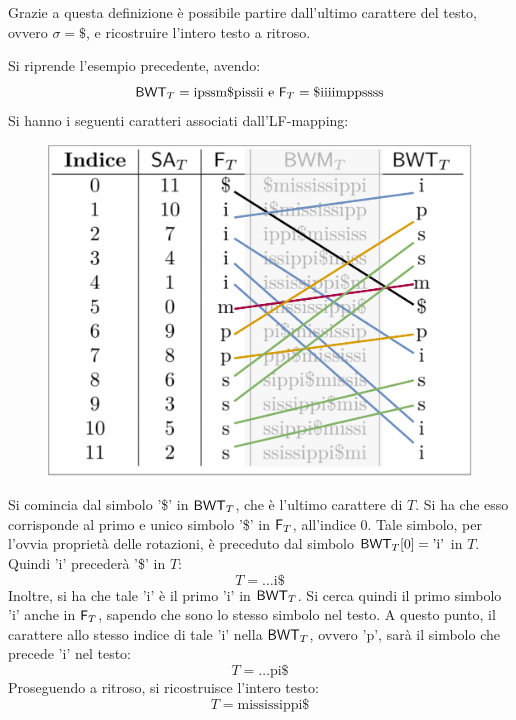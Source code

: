 Grazie a questa definizione è possibile partire dall'ultimo carattere del testo,
ovvero $\sigma=\$$, e ricostruire l'intero testo a ritroso. 
\begin{esempio}
  Si riprende l'esempio precedente, avendo:
  \[\mbox{\rm {\sf BWT}}_T=\mbox{ipssm\$pissii}\mbox{ e }\mbox{\rm {\sf F}}_T=\mbox{\$iiiimppssss}\]
  Si hanno i seguenti caratteri associati dall'LF-mapping:
  \begin{figure}[H]
    \centering
    \includegraphics[scale = 0.33]{img/lf2.pdf}
  \end{figure}
  Si comincia dal simbolo '\$' in $\mbox{\rm {\sf BWT}}_T$, che è l'ultimo carattere di $T$. Si
  ha che esso corrisponde al primo e unico simbolo '\$' in $\mbox{\rm {\sf F}}_T$, all'indice
  $0$. Tale simbolo, per l'ovvia proprietà delle rotazioni, è preceduto dal
  simbolo $\mbox{\rm {\sf BWT}}_T[0]=\mbox{'i'}$ in $T$. Quindi $\mbox{'i'}$ precederà '\$' in
  $T$:
  \[T=\ldots\mbox{i\$}\]
  Inoltre, si ha che
  tale $\mbox{'i'}$ è il primo $\mbox{'i'}$ in $\mbox{\rm {\sf BWT}}_T$. Si cerca quindi il
  primo simbolo $\mbox{'i'}$ anche in $\mbox{\rm {\sf F}}_T$,
  sapendo che sono lo stesso simbolo nel testo. A questo punto, il carattere
  allo
  stesso indice di tale $\mbox{'i'}$ nella $\mbox{\rm {\sf BWT}}_T$, ovvero
  $\mbox{'p'}$, sarà il simbolo che precede $\mbox{'i'}$ nel testo:
  \[T=\ldots\mbox{pi\$}\]
  Proseguendo a ritroso, si ricostruisce l'intero testo:
  \[T=\mbox{mississippi\$}\]
\end{esempio}

